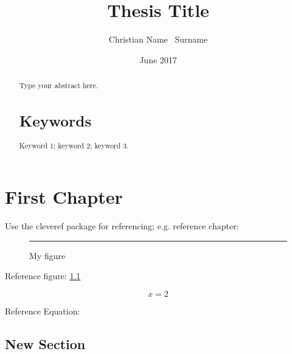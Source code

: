 \documentclass[12pt]{book}
\title{Thesis Title}
\author{Christian Name \ Surname}
\date{June 2017}
\begin{document}

\maketitlepages

\begin{abstract}
    Type your abstract here.
    \section*{Keywords}
    Keyword 1; keyword 2; keyword 3.
\end{abstract}

\sstableofcontents

\sslistoffigures

\sslistoftables

\sslistofcode

\begin{listofabbreviations}
\end{listofabbreviations}

\begin{listofsymbols}

\end{listofsymbols}

\chapter{First Chapter}\label{chap:one}

Use the cleveref package for referencing; e.g. reference chapter: 

\begin{figure}[h!]
  \centering
  \rule{20pt}{20pt}
  \caption{My figure}
  \label{fig:myfig}
\end{figure}

Reference figure: \cref{fig:myfig}

\begin{equation} 
x = 2 \label{myEq}
\end{equation}

Reference Equation: 

\section{New Section}
\end{document}
